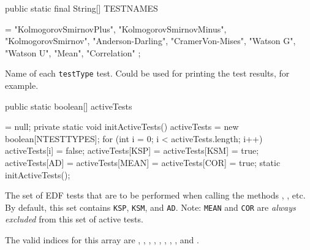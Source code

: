 \iffalse
 \begin{tabb}  Types of EDF tests supported by the present modules.
  Here, \texttt{MEAN} and \texttt{COR} usually
  represent tests based on the mean of the observations and on the
  correlation between pairs of successive observations.
 \hpierre {Est-ce utile que garder ces deux-l\`a dans ce type enum?}
 \hrichard {N\'ecessaire si l'on veut que les tableaux sVal, pVal,
  r\'eservent aussi une place pour ces 2. Sinon, il faudrait introduire
  au moins 4 nouvelles variables globales pour chaque module.}
 \end{tabb}
\fi
\begin{code}

   public static final String[] TESTNAMES\begin{hide} = {
    "KolmogorovSmirnovPlus", "KolmogorovSmirnovMinus",
    "KolmogorovSmirnov", "Anderson-Darling",
    "CramerVon-Mises", "Watson G", "Watson U",
    "Mean", "Correlation"
   };\end{hide}
\end{code}
 \begin{tabb}  Name of each \texttt{testType} test.
  Could be used for printing the test results, for example.
 \end{tabb}
\begin{code}

   public static boolean[] activeTests\begin{hide} = null;
   private static void initActiveTests() {
      activeTests = new boolean[NTESTTYPES];
      for (int i = 0; i < activeTests.length; i++)
        activeTests[i] = false;
      activeTests[KSP] = activeTests[KSM] = true;
      activeTests[AD] = activeTests[MEAN] = activeTests[COR] = true;
   }
   static {
      initActiveTests();
   }\end{hide}
\end{code}
 \begin{tabb} The set of EDF tests that are to be performed when calling
  the methods , , etc.
  By default, this set contains \texttt{KSP}, \texttt{KSM},
  and \texttt{AD}.  %
  Note: \texttt{MEAN} and \texttt{COR} are {\em always excluded\/}
  from this set of active tests.
\begin{htmlonly}
   The valid indices for this array are , ,
      , , , ,
      , , and .
\end{htmlonly}
 \end{tabb}
